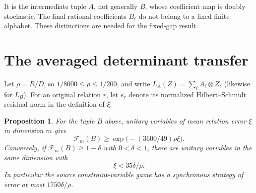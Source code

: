 \documentclass[11pt,a4paper]{article}
\newtheorem{proposition}[theorem]{Proposition}
\newcommand{\F}{\mathcal F}
\begin{document}
It is the intermediate tuple $A$, not generally $B$, whose coefficient map is doubly stochastic. The final rational coefficients $B_\ell$ do not belong to a fixed finite alphabet. These distinctions are needed for the fixed-gap result.

\section{The averaged determinant transfer}
Let $\rho=R/D$, so $1/8000\le\rho\le1/200$, and write $L_A(Z)=\sum_\ell A_\ell\otimes Z_\ell$ (likewise for $L_B$). For an original relation $r$, let $e_r$ denote its normalized Hilbert--Schmidt residual norm in the definition of $\xi$.
\begin{proposition}\label{prop:transfer}
For the tuple $B$ above, unitary variables of mean relation error $\xi$ in dimension $m$ give
\begin{equation}
 \F_m(B)\ge\exp\bigl(-(3600/49)\rho\xi\bigr).            \label{eq:forward}
\end{equation}
Conversely, if $\F_m(B)\ge1-\delta$ with $0<\delta<1$, there are unitary variables in the same dimension with
\begin{equation}
 \xi<35\delta/\rho.                                    \label{eq:reverse}
\end{equation}
In particular the source constraint-variable game has a synchronous strategy of error at most $1750\delta/\rho$.
\end{proposition}
\end{document}
